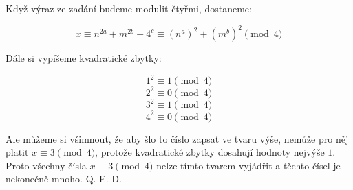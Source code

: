 \documentclass{fkssolpub}
\author{Ondřej Sedláček}
\begin{document}
Když výraz ze zadání budeme modulit čtyřmi, dostaneme:

\[
	x \equiv n^{2a} + m^{2b} + 4^c \equiv (n^{a})^2 + (m^{b})^2 \pmod{4}
\]

Dále si vypíšeme kvadratické zbytky:

\[
	1^2 \equiv 1 \pmod{4}
\]
\[
	2^2 \equiv 0 \pmod{4}
\]
\[
	3^2 \equiv 1 \pmod{4}
\]
\[
	4^2 \equiv 0 \pmod{4}
\]

Ale můžeme si všimnout, že aby šlo to číslo zapsat ve tvaru výše, nemůže pro něj platit $x \equiv 3 \pmod{4}$, protože kvadratické zbytky dosahují hodnoty nejvýše $1$. Proto všechny čísla $x \equiv 3 \pmod{4}$ nelze tímto tvarem vyjádřit a těchto čísel je nekonečně mnoho. Q. E. D.
\end{document}
